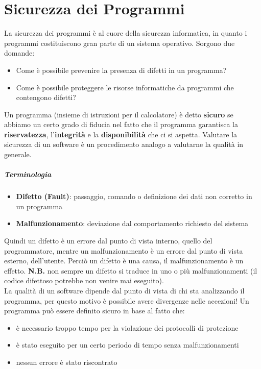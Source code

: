 \chapter{Sicurezza dei Programmi}
La sicurezza dei programmi è al cuore della sicurezza informatica, in quanto i programmi costituiscono gran parte di un sistema operativo. Sorgono due domande:
\begin{itemize}
\item Come è possibile prevenire la presenza di difetti in un programma?
\item Come è possibile proteggere le risorse informatiche da programmi che contengono difetti?
\end{itemize}

Un programma (insieme di istruzioni per il calcolatore) è detto \textbf{sicuro} se abbiamo un certo grado di fiducia nel fatto che il programma garantisca la \textbf{riservatezza}, l'\textbf{integrità} e la \textbf{disponibilità} che ci si aspetta.
Valutare la sicurezza di un software è un procedimento analogo a valutarne la qualità in generale.
\paragraph{Terminologia}
\begin{itemize}
\item \textbf{Difetto (Fault)}: passaggio, comando o definizione dei dati non corretto in un programma
\item \textbf{Malfunzionamento}: deviazione dal comportamento richiesto del sistema
\end{itemize}

Quindi un difetto è un errore dal punto di vista interno, quello del programmatore, mentre un malfunzionamento è un errore dal punto di vista esterno, dell'utente. Perciò un difetto è una causa, il malfunzionamento è un effetto. \textbf{N.B.} non sempre un difetto si traduce in uno o più malfunzionamenti (il codice difettoso potrebbe non venire mai eseguito). \\
La qualità di un software dipende dal punto di vista di chi sta analizzando il programma, per questo motivo è possibile avere divergenze nelle accezioni! 
\newline \newline
Un programma può essere definito sicuro in base al fatto che:

\begin{itemize}
\item è necessario troppo tempo per la violazione dei protocolli di protezione
\item è stato eseguito per un certo periodo di tempo senza malfunzionamenti 
\item nessun errore è stato riscontrato
\end{itemize}

